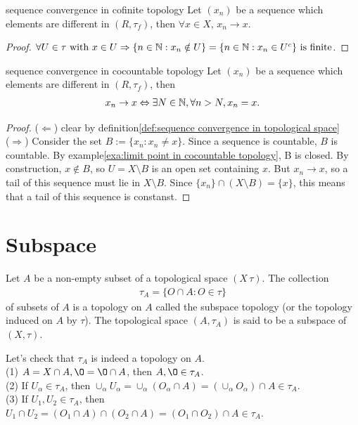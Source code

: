 \begin{proposition}{}{sequence convergence in cofinite topology}
    Let $(x_n)$ be a sequence which elements are different in $(R,\tau_f)$, then $\forall x\in X$, $x_n\rightarrow x$. 
\end{proposition}
\begin{proof}
    $\forall U\in \tau \text{ with }  x\in U \Rightarrow \{n\in \mathbb{N}:x_n\notin U\}= \{n\in \mathbb{N}:x_n\in U^c\} \text{ is finite}$.
\end{proof}
\begin{proposition}{}{sequence convergence in cocountable topology}
    Let $(x_n)$ be a sequence which elements are different in $(R,\tau_f)$, then
    \begin{align*}
        x_n\rightarrow x \Leftrightarrow \exists N\in\mathbb{N}, \forall n>N, x_n=x. 
    \end{align*}
\end{proposition}
\begin{proof}
    ($\Leftarrow$) clear by definition\ref{def:sequence convergence in topological space}
    \\
    ($\Rightarrow$) Consider the set $B:= \{x_n: x_n\neq x\}$. Since a sequence is countable, $B$ is countable. By example\ref{exa:limit point in cocountable topology}, B is closed.
    By construction, $x\notin B$, so $U=X\setminus B$ is an open set containing $x$. 
    But $x_n\rightarrow x$, so a tail of this sequence must lie in $X\setminus B$. Since $\{x_n\}\cap (X\setminus B)=\{x\}$, 
    this means that a tail of this sequence is constanst.  
\end{proof}

\section{Subspace}
\begin{definition}{}{}
    Let $A$ be a non-empty subset of a topological space $(X\,\tau)$. 
    The collection 
    \begin{align*}
        \tau_{A}=\{O\cap A: O\in \tau\}
    \end{align*}
    of subsets of $A$ is a topology on $A$ called the subspace topology
    (or the topology induced on $A$ by $\tau$). The topological space $(A,\tau_A)$ is said to be a subspace of $(X,\tau)$.
\end{definition}
Let's check that $\tau_A$ is indeed a topology on $A$.\\
(1) $A=X\cap A, \O = \O\cap A$, then $A,\O\in \tau_A$.\\
(2) If $U_{\alpha}\in \tau_A$, then $\cup_{\alpha}{U_\alpha} = \cup_{\alpha} (O_{\alpha}\cap A)=(\cup_{\alpha} O_{\alpha})\cap A\in\tau_A$.\\
(3) If $U_1,U_2\in\tau_A$, then $U_1\cap U_2 = (O_1\cap A)\cap (O_2\cap A)=(O_1\cap O_2)\cap A\in \tau_A$.

